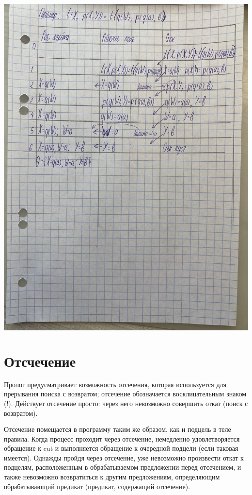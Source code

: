 \documentclass[12pt]{report}
\begin{document}
\includegraphics[width=\linewidth]{img/example}


\section{Отсчечение}

Пролог предусматривает возможность отсечения, которая используется для прерывания поиска с возвратом; отсечение обозначается восклицательным знаком (!). Действует отсечение просто: через него невозможно совершить откат (поиск с возвратом).

Отсечение помещается в программу таким же образом, как и подцель в теле правила. Когда процесс проходит через отсечение, немедленно удовлетворяется обращение к cut и выполняется обращение к очередной подцели (если таковая имеется). Однажды пройдя через отсечение, уже невозможно произвести откат к подцелям, расположенным в обрабатываемом предложении перед отсечением, и также невозможно возвратиться к другим предложениям, определяющим обрабатывающий предикат (предикат, содержащий отсечение).
\end{document}
